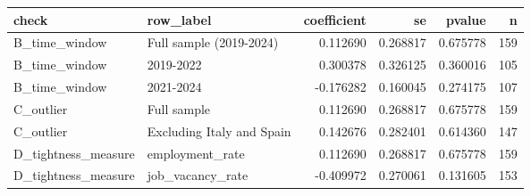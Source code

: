 \begin{tabular}{llrrrr}
\toprule
check & row_label & coefficient & se & pvalue & n \\
\midrule
B_time_window & Full sample (2019-2024) & 0.112690 & 0.268817 & 0.675778 & 159 \\
B_time_window & 2019-2022 & 0.300378 & 0.326125 & 0.360016 & 105 \\
B_time_window & 2021-2024 & -0.176282 & 0.160045 & 0.274175 & 107 \\
C_outlier & Full sample & 0.112690 & 0.268817 & 0.675778 & 159 \\
C_outlier & Excluding Italy and Spain & 0.142676 & 0.282401 & 0.614360 & 147 \\
D_tightness_measure & employment_rate & 0.112690 & 0.268817 & 0.675778 & 159 \\
D_tightness_measure & job_vacancy_rate & -0.409972 & 0.270061 & 0.131605 & 153 \\
\bottomrule
\end{tabular}
